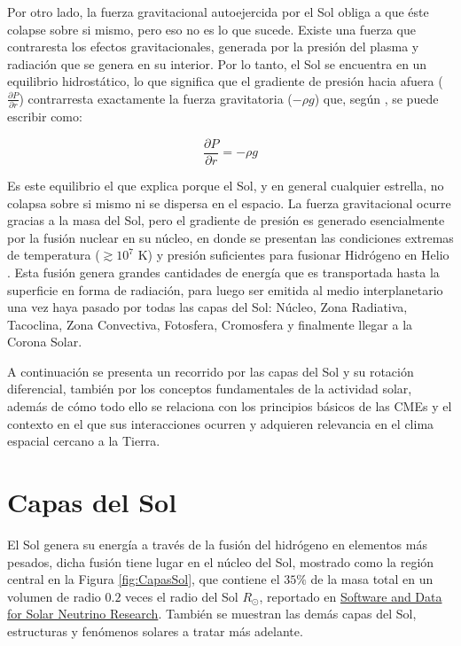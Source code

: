 Por otro lado, la fuerza gravitacional autoejercida por el Sol obliga a que éste colapse sobre si mismo, pero eso no es lo que sucede. Existe una fuerza que contraresta los efectos gravitacionales, generada por la presión del plasma y radiación que se genera en su interior. Por lo tanto, el Sol se encuentra en un equilibrio hidrostático, lo que significa que el gradiente de presión hacia afuera ($\frac{\partial P}{\partial r}$) contrarresta exactamente la fuerza gravitatoria ($-\rho g$) que, según \textcite[e.g.,][]{stix-2002, kopal-1966}, se puede escribir como: 

\begin{equation}
\frac{\partial P}{\partial r} = -\rho g
\end{equation}

Es este equilibrio el que explica porque el Sol, y en general cualquier estrella, no colapsa sobre si mismo ni se dispersa en el espacio. La fuerza gravitacional ocurre gracias a la masa del Sol, pero el gradiente de presión es generado esencialmente por la fusión nuclear en su núcleo, en donde se presentan las condiciones extremas de temperatura ($\gtrsim 10^{7}$ K) y presión suficientes para fusionar Hidrógeno en Helio \parencite[e.g.,][]{fiorentini-2004}. Esta fusión genera grandes cantidades de energía que es transportada hasta la superficie en forma de radiación, para luego ser emitida al medio interplanetario una vez haya pasado por todas las capas del Sol: Núcleo, Zona Radiativa, Tacoclina,  Zona Convectiva, Fotosfera, Cromosfera y finalmente llegar a la Corona Solar.

A continuación se presenta un recorrido por las capas del Sol y su rotación diferencial, también por los conceptos fundamentales de la actividad solar, además de cómo todo ello se relaciona con los principios básicos de las CMEs y el contexto en el que sus interacciones ocurren y adquieren relevancia en el clima espacial cercano a la Tierra.

\section{Capas del Sol}

El Sol genera su energía a través de la fusión del hidrógeno en elementos más pesados, dicha fusión tiene lugar en el núcleo del Sol, mostrado como la región central en la Figura \ref{fig:CapasSol}, que contiene el $35\%$ de la masa total en un volumen de radio $0.2$ veces el radio del Sol $R_{\odot}$, reportado en \href{https://www.sns.ias.edu/~jnb/SNdata/sndata.html}{Software and Data for Solar Neutrino Research}. También se muestran las demás capas del Sol, estructuras y fenómenos solares a tratar más adelante. 

